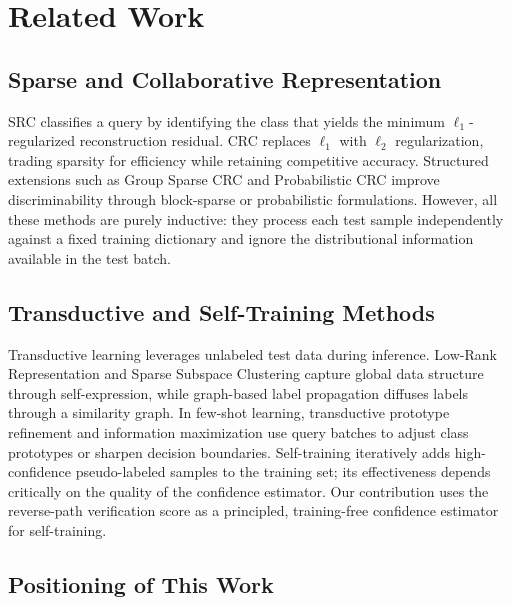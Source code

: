 \documentclass[10pt,comsoc]{IEEEtran}
\begin{document}
\section{Related Work}

\subsection{Sparse and Collaborative Representation}

SRC \cite{wright2009robust} classifies a query by identifying the class that yields the minimum $\ell_1$-regularized reconstruction residual. CRC \cite{zhang2011sparse} replaces $\ell_1$ with $\ell_2$ regularization, trading sparsity for efficiency while retaining competitive accuracy. Structured extensions such as Group Sparse CRC \cite{elhamifar2013robust} and Probabilistic CRC \cite{cai2016probabilistic} improve discriminability through block-sparse or probabilistic formulations. However, all these methods are purely inductive: they process each test sample independently against a fixed training dictionary and ignore the distributional information available in the test batch.

\subsection{Transductive and Self-Training Methods}

Transductive learning leverages unlabeled test data during inference. Low-Rank Representation \cite{liu2013low} and Sparse Subspace Clustering \cite{elhamifar2013ssc} capture global data structure through self-expression, while graph-based label propagation \cite{zhu2003semi, zhou2004learning} diffuses labels through a similarity graph. In few-shot learning, transductive prototype refinement \cite{liu2018learning} and information maximization \cite{boudiaf2020information} use query batches to adjust class prototypes or sharpen decision boundaries. Self-training \cite{scudder1965probability} iteratively adds high-confidence pseudo-labeled samples to the training set; its effectiveness depends critically on the quality of the confidence estimator. Our contribution uses the reverse-path verification score as a principled, training-free confidence estimator for self-training.

\subsection{Positioning of This Work}
\end{document}
